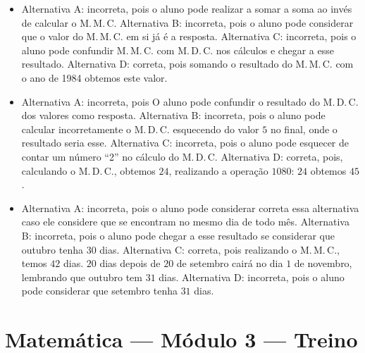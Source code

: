 \begin{itemize}
\item Alternativa A: incorreta, pois o aluno pode realizar a somar a soma ao
invés de calcular o M.\,M.\,C.
Alternativa B: incorreta, pois o aluno pode considerar que o valor do
M.\,M.\,C. em si já é a resposta.
Alternativa C: incorreta, pois o aluno pode confundir M.\,M.\,C. com M.\,D.\,C.
nos cálculos e chegar a esse resultado.
Alternativa D: correta, pois somando o resultado do M.\,M.\,C. com o ano de
1984 obtemos este valor.

\item Alternativa A: incorreta, pois O aluno pode confundir o resultado do
M.\,D.\,C. dos valores como resposta.
Alternativa B: incorreta, pois o aluno pode calcular incorretamente o
M.\,D.\,C. esquecendo do valor $5$ no final, onde o resultado seria esse.
Alternativa C: incorreta, pois o aluno pode esquecer de contar um número
``2'' no cálculo do M.\,D.\,C.
Alternativa D: correta, pois, calculando o M.\,D.\,C., obtemos $24$,
realizando a operação $1080$: $24$ obtemos $45$.

\item Alternativa A: incorreta, pois o aluno pode considerar correta essa
alternativa caso ele considere que se encontram no mesmo dia de todo
mês.
Alternativa B: incorreta, pois o aluno pode chegar a esse resultado se
considerar que outubro tenha $30$ dias.
Alternativa C: correta, pois realizando o M.\,M.\,C., temos $42$ dias. $20$ dias
depois de $20$ de setembro cairá no dia $1$ de novembro, lembrando que
outubro tem $31$ dias.
Alternativa D: incorreta, pois o aluno pode considerar que setembro
tenha $31$ dias.
\end{itemize}

\section*{Matemática — Módulo 3 — Treino}

